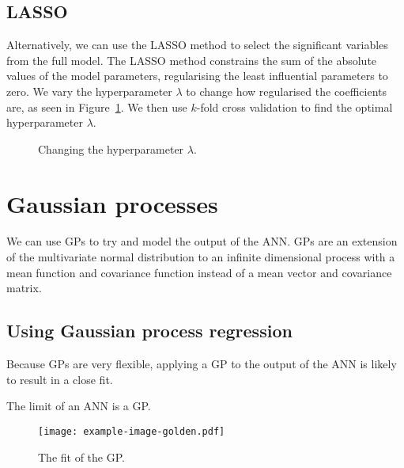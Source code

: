 \subsection{LASSO}

Alternatively, we can use the \ac{LASSO} method to select the significant variables from the full model.
The \ac{LASSO} method constrains the sum of the absolute values of the model parameters, regularising the least influential parameters to zero.
We vary the hyperparameter \(\lambda\) to change how regularised the coefficients are, as seen in Figure~\ref{fig:lasso-lambda}.
We then use \(k\)-fold cross validation to find the optimal hyperparameter \(\lambda\).

\begin{figure}[htbp]
	\centering
	
	\caption{Changing the hyperparameter \(\lambda\).}
	\label{fig:lasso-lambda}
\end{figure}


\section{Gaussian processes}

We can use \acp{GP} to try and model the output of the \ac{ANN}.
\acp{GP} are an extension of the multivariate normal distribution to an infinite dimensional process with a mean function and covariance function instead of a mean vector and covariance matrix.

\subsection{Using Gaussian process regression}

Because \acp{GP} are very flexible, applying a GP to the output of the ANN is likely to result in a close fit.

\begin{todo}
	The limit of an ANN is a GP.
\end{todo}

\begin{figure}[htbp]
	\centering
	\texttt{[image: example-image-golden.pdf]}
	\caption{The fit of the \ac{GP}.}
	\label{fig:gp-fit}
\end{figure}
